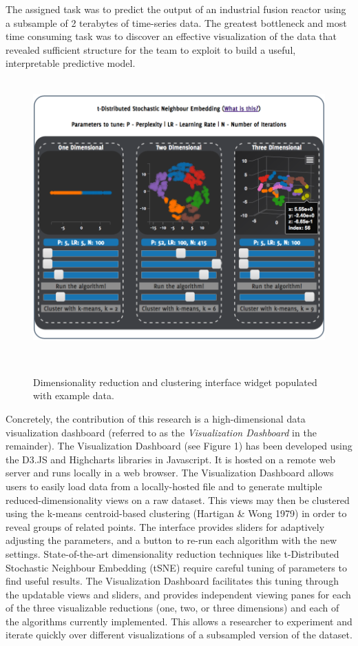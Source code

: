 \documentclass{sigchi}
\begin{document}
%
The assigned task was to predict the output of an industrial fusion reactor using a subsample of 2 terabytes of time-series data. %
%
The greatest bottleneck and most time consuming task was to discover an effective visualization of the data that revealed sufficient structure for the team to exploit to build a useful, interpretable predictive model. %
%
\\\\%
%
\begin{figure}
  \centering
  \includegraphics[width=.99\columnwidth]{figures/main_populated}
  \caption{Dimensionality reduction and clustering interface widget populated with example data.}~\label{fig:figure1}
\end{figure}
%
Concretely, the contribution of this research is a high-dimensional data visualization dashboard (referred to as the \textit{Visualization Dashboard} in the remainder). %
%
The Visualization Dashboard (see Figure 1) has been developed using the D3.JS and Highcharts libraries in Javascript. %
%
It is hosted on a remote web server and runs locally in a web browser. %
%
The Visualization Dashboard allows users to easily load data from a locally-hosted file and to generate multiple reduced-dimensionality views on a raw dataset. %
%
%
This views may then be clustered using the k-means centroid-based clustering (Hartigan \& Wong 1979) in order to reveal groups of related points. %
%
The interface provides sliders for adaptively adjusting the parameters, and a button to re-run each algorithm with the new settings. %
%
State-of-the-art dimensionality reduction techniques like t-Distributed Stochastic Neighbour Embedding (tSNE) \cite{maaten2008visualizing} require careful tuning of parameters to find useful results. %
%
The Visualization Dashboard facilitates this tuning through the updatable views and sliders, and provides independent viewing panes for each of the three visualizable reductions (one, two, or three dimensions) and each of the algorithms currently implemented. %
%
This allows a researcher to experiment and iterate quickly over different visualizations of a subsampled version of the dataset. %
%
\end{document}
